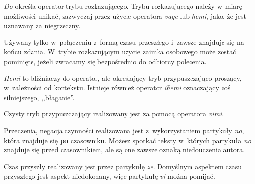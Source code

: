 \begin{spacing}{1.1}

\skipline

\emph{Do} określa operator trybu rozkazującego. Trybu rozkazującego należy 
w~miarę możliwości unikać, zazwyczaj przez użycie operatora \emph{vage} lub 
\emph{hemi}, jako, że jest uznawany za niegrzeczny.

Używany tylko w~połączeniu z~formą czasu przeszłego i~zawsze 
znajduje się na końcu zdania. W~trybie rozkazującym użycie zaimka osobowego 
może zostać pominięte, jeżeli zwracamy się bezpośrednio do odbiorcy polecenia.



\emph{Hemi} to bliźniaczy do operator, ale określający tryb 
przypuszczająco-proszący, w~zależności od kontekstu. Istnieje również operator 
\emph{ih́emi} oznaczający coś silniejszego, ,,błaganie''.



Czysty tryb przypuszczający realizowany jest za pomocą operatora \emph{vimi}.


Przeczenia, negacja czynności realizowana jest z~wykorzystaniem partykuły 
\emph{no}, która znajduje się \textbf{po} czasowniku. Możesz spotkać teksty
w~których partykuła \emph{no} znajduje się przed czasownikiem, ale są one
zawsze oznaką niedouczenia autora.





Czas przyszły realizowany jest przez partykułę \emph{ze}. Domyślnym aspektem 
czasu przyszłego jest aspekt niedokonany, więc partykułę \emph{vi} można 
pomijać.




\end{spacing}
